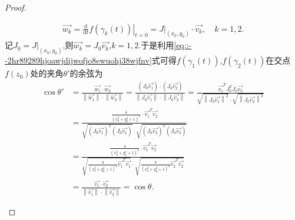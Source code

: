 \documentclass[../../main.tex]{subfiles}%
\begin{document}
\begin{proof}
\begin{enumerate}[(1)]
\begin{align*}
\overrightarrow{w_k}=\left. \frac{\mathrm{d}}{\mathrm{d}t}f\left( \gamma _k\left( t \right) \right) \right| _{t=0}=\left. J \right| _{\left( x_0,y_0 \right)}\cdot \overrightarrow{v_k},\quad k=1,2.
\end{align*}
记$J_0=\left. J \right| _{\left( x_0,y_0 \right)}$,则$\overrightarrow{w_k}=J_0\overrightarrow{v_k}$,$k=1,2$.于是利用\eqref{eq::--2hr89289hjoawjdijwofjo8ewuohj38wjfnv}式可得$f\left( \gamma _1\left( t \right) \right)$,$f\left( \gamma _2\left( t \right) \right)$在交点$f\left( z_0 \right)$处的夹角$\theta'$的余弦为
\begin{align*}
\cos \theta' &=\frac{\overrightarrow{w_1}\cdot \overrightarrow{w_2}}{\left\| \overrightarrow{w_1} \right\| \cdot \left\| \overrightarrow{w_2} \right\|}=\frac{\left( J_0\overrightarrow{v_1} \right) \cdot \left( J_0\overrightarrow{v_2} \right)}{\left\| J_0\overrightarrow{v_1} \right\| \cdot \left\| J_0\overrightarrow{v_2} \right\|}=\frac{\overrightarrow{v_1}^TJ_{0}^{T}J_0\overrightarrow{v_2}}{\sqrt{\left\| J_0\overrightarrow{v_1} \right\| ^2}\cdot \sqrt{\left\| J_0\overrightarrow{v_2} \right\| ^2}} \\
&=\frac{\frac{4}{\left( x_{0}^{2}+y_{0}^{2}+1 \right) ^2}\cdot \overrightarrow{v_1}^T\overrightarrow{v_2}}{\sqrt{\left( J_0\overrightarrow{v_1} \right) ^T\left( J_0\overrightarrow{v_1} \right)}\cdot \sqrt{\left( J_0\overrightarrow{v_2} \right) ^T\left( J_0\overrightarrow{v_2} \right)}} \\
&=\frac{\frac{4}{\left( x_{0}^{2}+y_{0}^{2}+1 \right) ^2}\cdot \overrightarrow{v_1}^T\overrightarrow{v_2}}{\sqrt{\frac{4}{\left( x_{0}^{2}+y_{0}^{2}+1 \right) ^2}\overrightarrow{v_1}^T\overrightarrow{v_1}}\cdot \sqrt{\frac{4}{\left( x_{0}^{2}+y_{0}^{2}+1 \right) ^2}\overrightarrow{v_2}^T\overrightarrow{v_2}}} \\
&=\frac{\overrightarrow{v_1}\cdot \overrightarrow{v_2}}{\left\| \overrightarrow{v_1} \right\| \cdot \left\| \overrightarrow{v_2} \right\|}=\cos \theta.
\end{align*}

\end{enumerate}

\end{proof}
\end{document}
